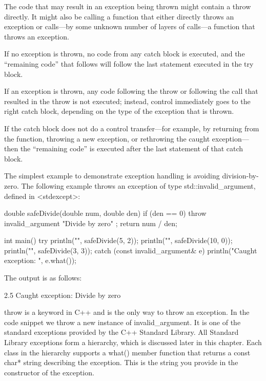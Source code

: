 The code that may result in an exception being thrown might contain a throw directly. It might also be calling a function that either directly throws an exception or calls—by some unknown number of layers of calls—a function that throws an exception.

If no exception is thrown, no code from any catch block is executed, and the “remaining code” that follows will follow the last statement executed in the try block.

If an exception is thrown, any code following the throw or following the call that resulted in the throw is not executed; instead, control immediately goes to the right catch block, depending on the type of the exception that is thrown.

If the catch block does not do a control transfer—for example, by returning from the function, throwing a new exception, or rethrowing the caught exception—then the “remaining code” is executed after the last statement of that catch block.

The simplest example to demonstrate exception handling is avoiding division-by-zero. The following example throws an exception of type std::invalid\_argument, defined in <stdexcept>:

\begin{cpp}
double safeDivide(double num, double den)
{
    if (den == 0) { throw invalid_argument { "Divide by zero" }; }
    return num / den;
}

int main()
{
    try {
        println("{}", safeDivide(5, 2));
        println("{}", safeDivide(10, 0));
        println("{}", safeDivide(3, 3));
    } catch (const invalid_argument& e) {
        println("Caught exception: {}", e.what());
    }
}
\end{cpp}

The output is as follows:

\begin{shell}
2.5
Caught exception: Divide by zero
\end{shell}

throw is a keyword in C++ and is the only way to throw an exception. In the code snippet we throw a new instance of invalid\_argument. It is one of the standard exceptions provided by the C++ Standard Library. All Standard Library exceptions form a hierarchy, which is discussed later in this chapter. Each class in the hierarchy supports a what() member function that returns a const char* string describing the exception. This is the string you provide in the constructor of the exception.

